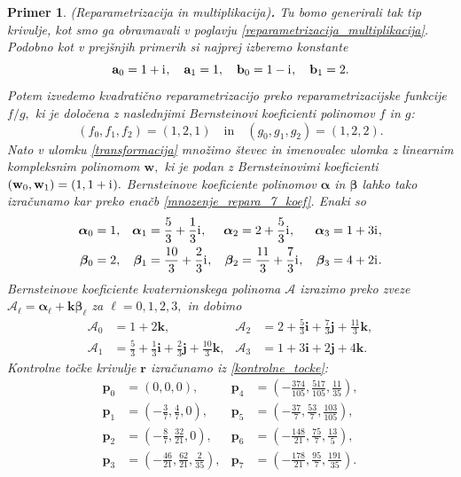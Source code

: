 \documentclass[12pt,a4paper,twoside]{article}
\newcommand{\iu}{\mathrm{i}\mkern1mu} %
\theoremstyle{definition} %
\theoremstyle{plain} %
\theoremstyle{primerstyle}
\newtheorem{primer}[definicija]{Primer}
\numberwithin{equation}{section}  %
\newcommand{\aV}{\mathbf{a}}
\newcommand{\bV}{\mathbf{b}}
\newcommand{\pV}{\mathbf{p}}
\newcommand{\rV}{\mathbf{r}}
\newcommand{\iV}{\mathbf{i}}
\newcommand{\jV}{\mathbf{j}}
\newcommand{\kV}{\mathbf{k}}
\newcommand{\wV}{\mathbf{w}}
\newcommand{\AQ}{\mathcal{A}}
\newcommand{\balpha}{\boldsymbol \alpha}
\newcommand{\bbeta}{\boldsymbol \beta}
\begin{document}
\begin{primer}
	\label{primer3}
	\textnormal{ }(Reparametrizacija in multiplikacija)\textbf{.}
	Tu bomo generirali tak tip krivulje, kot smo ga obravnavali v poglavju \ref{reparametrizacija_multiplikacija}. Podobno kot v prejšnjih primerih si najprej izberemo konstante
	\begin{equation*}
		\aV_0=1+\iu,\quad\aV_1=1,\quad\bV_0=1-\iu,\quad\bV_1=2.
	\end{equation*}
	Potem izvedemo kvadratično reparametrizacijo preko reparametrizacijske funkcije $f/g,$ ki je določena z naslednjimi Bernsteinovi koeficienti polinomov $f$ in $g$:
	$$(f_0,f_1,f_2)=(1,2,1)\quad\text{in}\quad(g_0,g_1,g_2)=(1,2,2).$$ Nato v ulomku \eqref{transformacija} množimo števec in imenovalec ulomka z linearnim kompleksnim polinomom $\wV,$ ki je podan z Bernsteinovimi koeficienti $(\wV_0,\wV_1)=(1,1+\iu).$ Bernsteinove koeficiente polinomov $\balpha$ in $\bbeta$ lahko tako izračunamo kar preko enačb \eqref{mnozenje_repara_7_koef}. Enaki so
	\begin{align*}
		\balpha_0&=1,&\balpha_1&=\frac{5}{3}+\frac{1}{3}\iu,&\balpha_2&=2+\frac{5}{3}\iu,&\balpha_3&=1+3\iu,\\
		\bbeta_0&=2,&\bbeta_1&=\frac{10}{3}+\frac{2}{3}\iu,&\bbeta_2&=\frac{11}{3}+\frac{7}{3}\iu,&\bbeta_3&=4+2\iu.
	\end{align*}
	Bernsteinove koeficiente kvaternionskega polinoma $\AQ$ izrazimo preko zveze $\AQ_\ell=\balpha_\ell+\kV\bbeta_\ell$ za $\ell=0,1,2,3,$ in dobimo
	\begin{align*}
		\AQ_0&=1+2\kV,&\AQ_2&=2+\frac{5}{3}\iV+\frac{7}{3}\jV+\frac{11}{3}\kV,\\
		\AQ_1&=\frac{5}{3}+\frac{1}{3}\iV+\frac{2}{3}\jV+\frac{10}{3}\kV,&\AQ_3&=1+3\iV+2\jV+4\kV.
	\end{align*}
	Kontrolne točke krivulje $\rV$ izračunamo iz \eqref{kontrolne_tocke}:
	\begin{align*}
		\pV_0&=(0,0,0),&\pV_4&=\left(-\frac{374}{105},\frac{517}{105},\frac{11}{35}\right),\\
		\pV_1&=\left(-\frac{3}{7},\frac{4}{7},0 \right),&\pV_5&=\left(-\frac{37}{7},\frac{53}{7},\frac{103}{105}\right),\\
		\pV_2&=\left(-\frac{8}{7},\frac{32}{21},0\right),&\pV_6&=\left(-\frac{148}{21},\frac{75}{7},\frac{13}{5}\right),\\
		\pV_3&=\left(-\frac{46}{21},\frac{62}{21},\frac{2}{35}\right),&\pV_7&=\left(-\frac{178}{21},\frac{95}{7},\frac{191}{35}\right).
	\end{align*}

\end{primer}
\end{document}
